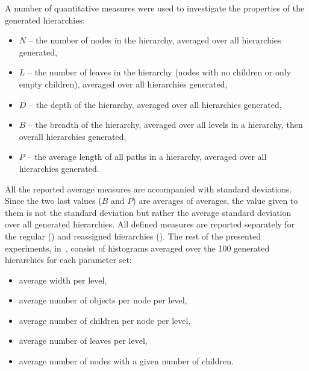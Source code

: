 \documentclass{article}
\begin{document}
	A number of quantitative measures were used to investigate the properties of the generated hierarchies:
    \begin{itemize}
        \item $N$ -- the number of nodes in the hierarchy, averaged over all hierarchies generated,
        \item $L$ -- the number of leaves in the hierarchy (nodes with no children or only empty children), averaged over all hierarchies generated,
        \item $D$ -- the depth of the hierarchy, averaged over all hierarchies generated,
        \item $B$ -- the breadth of the hierarchy, averaged over all levels in a hierarchy, then overall hierarchies generated,
        \item $P$ -- the average length of all paths in a hierarchy, averaged over all hierarchies generated.
	\end{itemize}
	
	All the reported average measures are accompanied with standard deviations. Since the two last values ($B$ and $P$) are averages of averages, the value given to them is not the standard deviation but rather the average standard deviation over all generated hierarchies. All defined measures are reported separately for the regular () and reassigned hierarchies ().
    The rest of the presented experiments, in~, consist of histograms averaged over the 100 generated hierarchies for each parameter set:
	\begin{itemize}
    	\item average width per level, %
		\item average number of objects per node per level, %
        \item average number of children per node per level, %
		\item average number of leaves per level, %
		\item average number of nodes with a given number of children. %
	\end{itemize}
	
\end{document}
